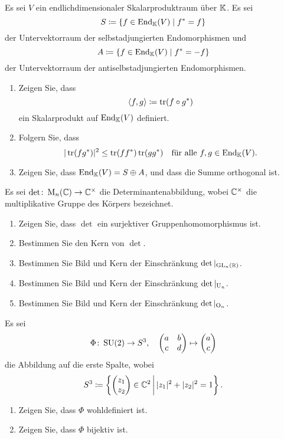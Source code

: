 \documentclass[a4paper,10pt]{scrartcl}
\begin{document}
\begin{question}
  Es sei $V$ ein endlichdimensionaler Skalarproduktraum über $\mathbb{K}$.
  Es sei
  \[
    S \coloneqq \{ f \in \operatorname{End}_{\mathbb{K}}(V) \mid f^* = f \}
  \]
  der Untervektorraum der selbstadjungierten Endomorphismen und
  \[
    A \coloneqq \{ f \in \operatorname{End}_{\mathbb{K}}(V) \mid f^* = -f \}
  \]
  der Untervektorraum der antiselbstadjungierten Endomorphismen.
  \begin{enumerate}
    \item
      Zeigen Sie, dass
      \[
        \langle f, g \rangle \coloneqq \operatorname{tr}(f \circ g^*)
      \]
      ein Skalarprodukt auf $\operatorname{End}_{\mathbb{K}}(V)$ definiert.
    \item
      Folgern Sie, dass
      \[
        |\operatorname{tr}(f g^*)|^2 \leq \operatorname{tr}(f f^*) \operatorname{tr}(g g^*)
        \quad
        \text{für alle $f, g \in \operatorname{End}_{\mathbb{K}}(V)$}.
      \]
    \item
      Zeigen Sie, dass $\operatorname{End}_{\mathbb{K}}(V) = S \oplus A$, und dass die Summe orthogonal ist.
  \end{enumerate}
\end{question}


\begin{question}
  Es sei $\det \colon \operatorname{M}_n(\mathbb{C}) \to \mathbb{C}^\times$ die Determinantenabbildung, wobei $\mathbb{C}^\times$ die multiplikative Gruppe des Körpers bezeichnet.
  \begin{enumerate}[leftmargin=*]
    \item
      Zeigen Sie, dass $\det$ ein surjektiver Gruppenhomomorphismus ist.
    \item
      Bestimmen Sie den Kern von $\det$.
    \item
      Bestimmen Sie Bild und Kern der Einschränkung $\det|_{\operatorname{GL}_n(\mathbb{R})}$.
    \item
      Bestimmen Sie Bild und Kern der Einschränkung $\det|_{\operatorname{U}_n}$.
    \item
      Bestimmen Sie Bild und Kern der Einschränkung $\det|_{\operatorname{O}_n}$.
  \end{enumerate}
\end{question}


\begin{question}
  Es sei
  \[
    \Phi \colon \operatorname{SU}(2) \to S^3,
    \quad
    \begin{pmatrix}
      a & b \\
      c & d
    \end{pmatrix}
    \mapsto
    \begin{pmatrix} a \\ c \end{pmatrix}
  \]
  die Abbildung auf die erste Spalte, wobei
  \[
              S^3
    \coloneqq \left\{ \begin{pmatrix} z_1 \\ z_2 \end{pmatrix} \in \mathbb{C}^2 \,\middle|\, |z_1|^2 + |z_2|^2 = 1 \right\}.
  \]
  \begin{enumerate}[leftmargin=*]
    \item
      Zeigen Sie, dass $\Phi$ wohldefiniert ist.
    \item
      Zeigen Sie, dass $\Phi$ bijektiv ist.
  \end{enumerate}
\end{question}
\end{document}
